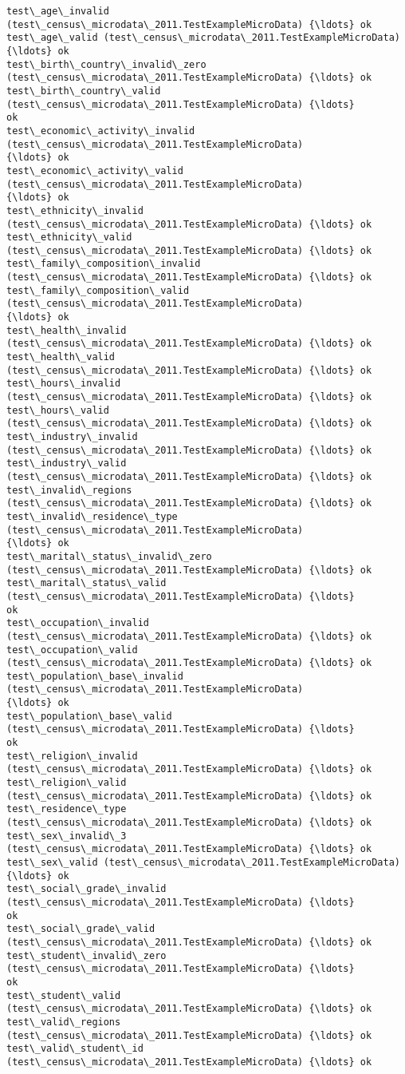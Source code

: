 \documentclass[11pt]{article}
\begin{document}
    \begin{Verbatim}[commandchars=\\\{\}]
test\_age\_invalid (test\_census\_microdata\_2011.TestExampleMicroData) {\ldots} ok
test\_age\_valid (test\_census\_microdata\_2011.TestExampleMicroData) {\ldots} ok
test\_birth\_country\_invalid\_zero
(test\_census\_microdata\_2011.TestExampleMicroData) {\ldots} ok
test\_birth\_country\_valid (test\_census\_microdata\_2011.TestExampleMicroData) {\ldots}
ok
test\_economic\_activity\_invalid (test\_census\_microdata\_2011.TestExampleMicroData)
{\ldots} ok
test\_economic\_activity\_valid (test\_census\_microdata\_2011.TestExampleMicroData)
{\ldots} ok
test\_ethnicity\_invalid (test\_census\_microdata\_2011.TestExampleMicroData) {\ldots} ok
test\_ethnicity\_valid (test\_census\_microdata\_2011.TestExampleMicroData) {\ldots} ok
test\_family\_composition\_invalid
(test\_census\_microdata\_2011.TestExampleMicroData) {\ldots} ok
test\_family\_composition\_valid (test\_census\_microdata\_2011.TestExampleMicroData)
{\ldots} ok
test\_health\_invalid (test\_census\_microdata\_2011.TestExampleMicroData) {\ldots} ok
test\_health\_valid (test\_census\_microdata\_2011.TestExampleMicroData) {\ldots} ok
test\_hours\_invalid (test\_census\_microdata\_2011.TestExampleMicroData) {\ldots} ok
test\_hours\_valid (test\_census\_microdata\_2011.TestExampleMicroData) {\ldots} ok
test\_industry\_invalid (test\_census\_microdata\_2011.TestExampleMicroData) {\ldots} ok
test\_industry\_valid (test\_census\_microdata\_2011.TestExampleMicroData) {\ldots} ok
test\_invalid\_regions (test\_census\_microdata\_2011.TestExampleMicroData) {\ldots} ok
test\_invalid\_residence\_type (test\_census\_microdata\_2011.TestExampleMicroData)
{\ldots} ok
test\_marital\_status\_invalid\_zero
(test\_census\_microdata\_2011.TestExampleMicroData) {\ldots} ok
test\_marital\_status\_valid (test\_census\_microdata\_2011.TestExampleMicroData) {\ldots}
ok
test\_occupation\_invalid (test\_census\_microdata\_2011.TestExampleMicroData) {\ldots} ok
test\_occupation\_valid (test\_census\_microdata\_2011.TestExampleMicroData) {\ldots} ok
test\_population\_base\_invalid (test\_census\_microdata\_2011.TestExampleMicroData)
{\ldots} ok
test\_population\_base\_valid (test\_census\_microdata\_2011.TestExampleMicroData) {\ldots}
ok
test\_religion\_invalid (test\_census\_microdata\_2011.TestExampleMicroData) {\ldots} ok
test\_religion\_valid (test\_census\_microdata\_2011.TestExampleMicroData) {\ldots} ok
test\_residence\_type (test\_census\_microdata\_2011.TestExampleMicroData) {\ldots} ok
test\_sex\_invalid\_3 (test\_census\_microdata\_2011.TestExampleMicroData) {\ldots} ok
test\_sex\_valid (test\_census\_microdata\_2011.TestExampleMicroData) {\ldots} ok
test\_social\_grade\_invalid (test\_census\_microdata\_2011.TestExampleMicroData) {\ldots}
ok
test\_social\_grade\_valid (test\_census\_microdata\_2011.TestExampleMicroData) {\ldots} ok
test\_student\_invalid\_zero (test\_census\_microdata\_2011.TestExampleMicroData) {\ldots}
ok
test\_student\_valid (test\_census\_microdata\_2011.TestExampleMicroData) {\ldots} ok
test\_valid\_regions (test\_census\_microdata\_2011.TestExampleMicroData) {\ldots} ok
test\_valid\_student\_id (test\_census\_microdata\_2011.TestExampleMicroData) {\ldots} ok


\end{Verbatim}
\end{document}
